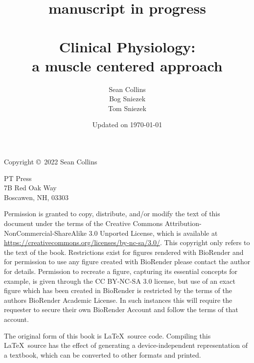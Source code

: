 
% 




\title{manuscript in progress \\~\\ {\bf{\huge{Clinical Physiology:}}  \\ a muscle centered approach}}

\author{Sean Collins \\ Bog Sniezek \\ Tom Sniezek}

\date{Updated on \today}
\maketitle

\pagebreak
\thispagestyle{empty}

{\small
Copyright \copyright ~2022 Sean Collins


\vspace{0.2in}

\begin{flushleft}
PT Press       \\
7B Red Oak Way        \\
Boscawen, NH, 03303
\end{flushleft}

Permission is granted to copy, distribute, and/or modify the text of this document under the terms of the Creative Commons Attribution-NonCommercial-ShareAlike 3.0 Unported License, which is available at \url{https://creativecommons.org/licenses/by-nc-sa/3.0/}. This copyright only refers to the text of the book. Restrictions exist for figures rendered with BioRender and for permission to use any figure created with BioRender please contact the author for details. Permission to recreate a figure, capturing its essential concepts for example, is given through the CC BY-NC-SA 3.0 license, but use of an exact figure which has been created in BioRender is restricted by the terms of the authors BioRender Academic License. In such instances this will require the requester to secure their own BioRender Account and follow the terms of that account.

The original form of this book is \LaTeX\ source code.  Compiling this \LaTeX\ source has the effect of generating a device-independent representation of a textbook, which can be converted to other formats and printed.

\vspace{0.2in}

} %

